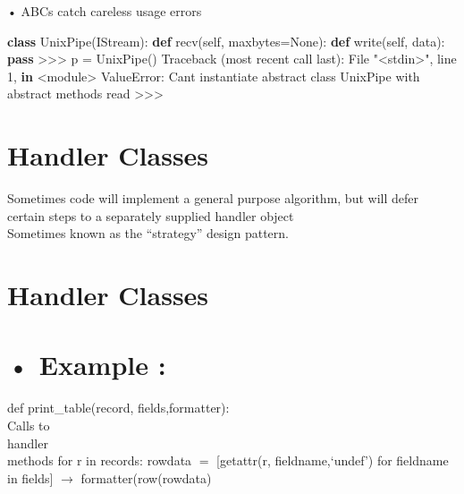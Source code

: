 \documentclass[
  letterpaper,
  DIV=11,
  numbers=noendperiod]{scrreprt}
\newenvironment{Shaded}{\begin{snugshade}}{\end{snugshade}}
\newcommand{\ControlFlowTok}[1]{\textcolor[rgb]{0.00,0.23,0.31}{\textbf{#1}}}
\newcommand{\DecValTok}[1]{\textcolor[rgb]{0.68,0.00,0.00}{#1}}
\newcommand{\KeywordTok}[1]{\textcolor[rgb]{0.00,0.23,0.31}{\textbf{#1}}}
\newcommand{\NormalTok}[1]{\textcolor[rgb]{0.00,0.23,0.31}{#1}}
\newcommand{\OperatorTok}[1]{\textcolor[rgb]{0.37,0.37,0.37}{#1}}
\newcommand{\PreprocessorTok}[1]{\textcolor[rgb]{0.68,0.00,0.00}{#1}}
\newcommand{\StringTok}[1]{\textcolor[rgb]{0.13,0.47,0.30}{#1}}
\newcommand{\VariableTok}[1]{\textcolor[rgb]{0.07,0.07,0.07}{#1}}
\begin{document}
• ABCs catch careless usage errors

\begin{Shaded}
\begin{Highlighting}[]
\KeywordTok{class}\NormalTok{ UnixPipe(IStream): }\KeywordTok{def}\NormalTok{ recv(}\VariableTok{self}\NormalTok{, maxbytes}\OperatorTok{=}\VariableTok{None}\NormalTok{): }\KeywordTok{def}\NormalTok{ write(}\VariableTok{self}\NormalTok{, data): }\ControlFlowTok{pass} \OperatorTok{\textgreater{}\textgreater{}\textgreater{}}\NormalTok{ p }\OperatorTok{=}\NormalTok{ UnixPipe() Traceback (most recent call last): File }\StringTok{"\textless{}stdin\textgreater{}"}\NormalTok{, line }\DecValTok{1}\NormalTok{, }\KeywordTok{in} \OperatorTok{\textless{}}\NormalTok{module}\OperatorTok{\textgreater{}} \PreprocessorTok{ValueError}\NormalTok{: Can}\StringTok{\textquotesingle{}t instantiate abstract class UnixPipe with abstract methods read \textgreater{}\textgreater{}\textgreater{} }
\end{Highlighting}
\end{Shaded}


\chapter{Handler Classes}\label{handler-classes}

Sometimes code will implement a general purpose algorithm, but will
defer certain steps to a separately supplied handler object\\
Sometimes known as the ``strategy'' design pattern.


\chapter{Handler Classes}\label{handler-classes-1}


\chapter{• Example :}\label{example-1}

def print\_table(record, fields,formatter):\\
Calls to\\
handler\\
methods for r in records: rowdata \(=\) {[}getattr(r, fieldname,`undef')
for fieldname in fields{]} \(\rightarrow\) formatter(row(rowdata)
\end{document}
